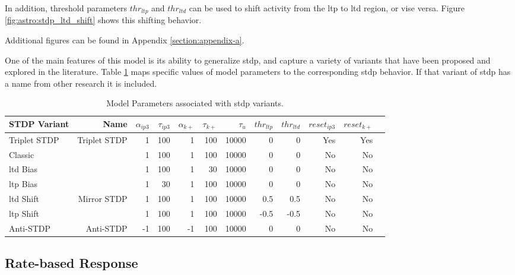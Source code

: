 
In addition, threshold parameters $thr_{ltp}$ and $thr_{ltd}$ can be used to
shift activity from the \gls{ltp} to \gls{ltd} region, or vise versa. Figure
\ref{fig:astro:stdp_ltd_shift} shows this shifting behavior.


Additional figures can be found in Appendix \ref{section:appendix-a}.

One of the main features of this model is its ability to generalize \gls{stdp},
and capture a variety of variants that have been proposed and explored in the
literature. Table \ref{table:astro_varient_params} maps specific values of
model parameters to the corresponding \gls{stdp} behavior. If that
variant of \gls{stdp} has a name from other research it is included.

\begin{table}[!htp]\centering
\caption{Model Parameters associated with \gls{stdp} variants.} \label{table:astro_varient_params}
\scriptsize
\begin{tabular}{lrrrrrrrrrrr}\toprule
STDP Variant &Name &$\alpha_{ip3}$ &$\tau_{ip3}$ &$\alpha_{k+}$ &$\tau_{k+}$ &$\tau_u$ &$thr_{ltp}$ &$thr_{ltd}$ &$reset_{ip3}$ &$reset_{k+}$ \\\midrule
Triplet STDP &Triplet STDP &1 &100 &1 &100 &10000 &0 &0 &Yes &Yes \\
Classic & &1 &100 &1 &100 &10000 &0 &0 &No &No \\
\Gls{ltd} Bias & &1 &100 &1 &30 &10000 &0 &0 &No &No \\
\Gls{ltp} Bias & &1 &30 &1 &100 &10000 &0 &0 &No &No \\
\Gls{ltd} Shift &Mirror STDP &1 &100 &1 &100 &10000 &0.5 &0.5 &No &No \\
\Gls{ltp} Shift & &1 &100 &1 &100 &10000 &-0.5 &-0.5 &No &No \\
Anti-STDP &Anti-STDP &-1 &100 &-1 &100 &10000 &0 &0 &No &No \\
\bottomrule
\end{tabular}
\end{table}

\subsection{Rate-based Response} \label{sec:rate_response}

